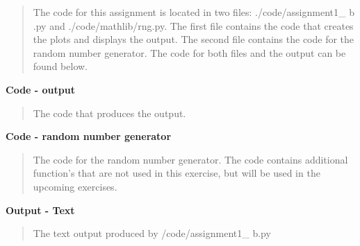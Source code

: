 \begin{quote}
The code for this assignment is located in two files: \textsf{./code/assignment1\_ b .py} and \textsf{./code/mathlib/rng.py}. The first file contains the code that creates the plots and displays the output. The second file contains the code for the random number generator. The code for both files and the output can be found below.



\end{quote}
\textbf{Code - output } 
\begin{quote}
 The code that produces the output.

\end{quote}

\textbf{Code - random number generator } 
\begin{quote}
The code for the random number generator. The code contains additional function's that are not used in this exercise, but will be used in the upcoming exercises.

\end{quote}


\textbf{Output - Text}
\begin{quote}
The text output produced by \textsf{/code/assignment1\_ b.py} 

\end{quote}

